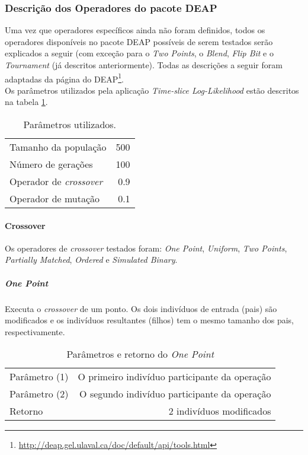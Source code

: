 \subsubsection{Descrição dos Operadores do pacote DEAP}
Uma vez que operadores específicos ainda não foram definidos, todos os operadores disponíveis no pacote DEAP possíveis de serem testados serão explicados a seguir (com exceção para o {\it Two Points}, o {\it Blend}, {\it Flip Bit} e o {\it Tournament} (já descritos anteriormente). Todas as descrições a seguir foram adaptadas da página do DEAP\footnote[4]{\url {http://deap.gel.ulaval.ca/doc/default/api/tools.html}}.\\

Os parâmetros utilizados pela aplicação {\it Time-slice Log-Likelihood} estão descritos na tabela \ref{GAParameters-2}.\\

\begin{table}[!h]
  \begin{center}
  \begin{tabular}{|l|r|}
    \hline
    Tamanho da população & 500\\
    Número de gerações & 100\\
    Operador de {\it crossover} & 0.9\\
    Operador de mutação & 0.1\\
    \hline    
  \end{tabular}
  \end{center}
  \caption{Parâmetros utilizados.}
  \label{GAParameters-2}
\end{table}

\paragraph{Crossover}
Os operadores de {\it crossover} testados foram: {\it One Point}, {\it Uniform}, {\it Two Points}, {\it Partially Matched}, {\it Ordered} e {\it Simulated Binary}.\\

\subparagraph{One Point}
Executa o {\it crossover} de um ponto. Os dois indivíduos de entrada (pais) são modificados e os indivíduos resultantes (filhos) tem o mesmo tamanho dos pais, respectivamente.\\

\begin{table}[!h]
  \begin{center}
  \begin{tabular}{|l|r|}
    \hline
    Parâmetro (1) & O primeiro indivíduo participante da operação \\
    Parâmetro (2) & O segundo indivíduo participante da operação \\
    Retorno & 2 indivíduos modificados\\
    \hline    
  \end{tabular}
  \end{center}
  \caption{Parâmetros e retorno do {\it One Point}}
  \label{One Point}
\end{table}

